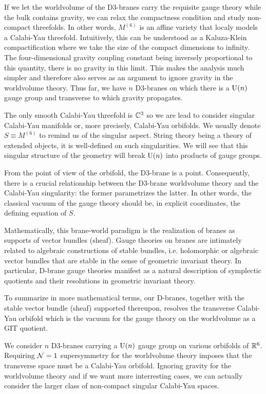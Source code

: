 \documentclass[a4paper,11pt]{article}
\begin{document}
    If we let the worldvolume of the D$3$-branes carry the requisite gauge theory while the bulk contains gravity, we can relax the compactness condition and study non-compact threefolds. In other words, $M^{(6)}$ is an affine variety that localy models a Calabi-Yau threefold. Intuitively, this can be understood as a Kaluza-Klein compactification where we take the size of the compact dimensions to infinity. The four-dimensional gravity coupling constant being inversely proportional to this quantity, there is no gravity in this limit. This makes the analysis much simpler and therefore also serves as an argument to ignore gravity in the worldvolume theory. Thus far, we have $n$ D$3$-branes on which there is a $\text{U}(n)$ gauge group and transverse to which gravity propagates.

    The only smooth Calabi-Yau threefold is $\mathbb{C}^3$ so we are lead to consider singular Calabi-Yau manifolds or, more precisely, Calabi-Yau orbifolds. We usually denote $S\equiv M^{(6)}$ to remind us of the singular aspect. String theory being a theory of extended objects, it is well-defined on such singularities. We will see that this singular structure of the geometry will break $\text{U}(n)$ into products of gauge groups.
    
    From the point of view of the orbifold, the D$3$-brane is a point. Consequently, there is a crucial relationship between the D$3$-brane worldvolume theory and the Calabi-Yau singularity: the former parametrizes the latter. In other words, the classical vacuum of the gauge theory should be, in explicit coordinates, the defining equation of $S$.

    Mathematically, this brane-world paradigm is the realization of branes as supports of vector bundles (sheaf). Gauge theories on branes are intimately related to algebraic constructions of stable bundles, i.e. holomorphic or algebraic vector bundles that are stable in the sense of geometric invariant theory. In particular, D-brane gauge theories manifest as a natural description of symplectic quotients and their resolutions in geometric invariant theory.

    To summarize in more mathematical terms, our D-branes, together with the stable vector bundle (sheaf) supported thereupon, resolves the transverse Calabi-Yau orbifold which is the vacuum for the gauge theory on the worldvolume as a GIT quotient.

    \begin{result}
        We consider $n$ D$3$-branes carrying a $\text{U}(n)$ gauge group on various orbifolds of $\mathbb{R}^6$. Requiring $\mathcal{N}=1$ supersymmetry for the worldvolume theory imposes that the transverse space must be a Calabi-Yau orbifold. Ignoring gravity for the worldvolume theory and if we want more interresting cases, we can actually consider the larger class of non-compact singular Calabi-Yau spaces.
    \end{result}
    
\end{document}
